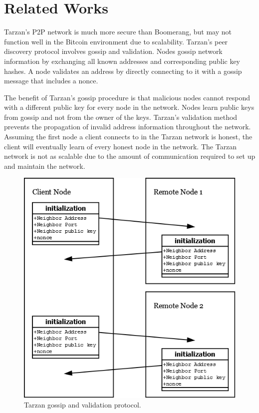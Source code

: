 \section{Related Works}
Tarzan’s P2P network is much more secure than Boomerang, but may not function well in the Bitcoin environment due to scalability. Tarzan’s peer discovery protocol involves gossip and validation. Nodes gossip network information by exchanging all known addresses and corresponding public key hashes. A node validates an address by directly connecting to it with a gossip message that includes a nonce.

The benefit of Tarzan’s gossip procedure is that malicious nodes cannot respond with a different public key for every node in the network. Nodes learn public keys from gossip and not from the owner of the keys. Tarzan’s validation method prevents the propagation of invalid address information throughout the network. Assuming the first node a client connects to in the Tarzan network is honest, the client will eventually learn of every honest node in the network. The Tarzan network is not as scalable due to the amount of communication required to set up and maintain the network.

\begin{figure}[ht!]
\begin{center}
\includegraphics[scale=0.3]{./images/tarzan_protocol.png}
\caption{Tarzan gossip and validation protocol.}
\label{fig:tarzan_protocol}
\end{center}
\end{figure}

